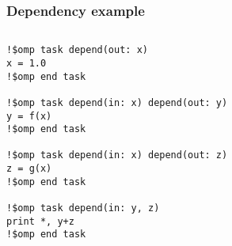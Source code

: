\documentclass{beamer}
\begin{document}
\begin{frame}[fragile]
\frametitle{Dependency example}
\begin{columns}
\begin{column}{0.7\textwidth}
\begin{verbatim}
!$omp task depend(out: x)
x = 1.0
!$omp end task

!$omp task depend(in: x) depend(out: y)
y = f(x)
!$omp end task

!$omp task depend(in: x) depend(out: z)
z = g(x)
!$omp end task

!$omp task depend(in: y, z)
print *, y+z
!$omp end task
\end{verbatim}
\end{column}

\begin{column}{0.3\textwidth}
\end{column}
\end{columns}
\end{frame}
\end{document}
